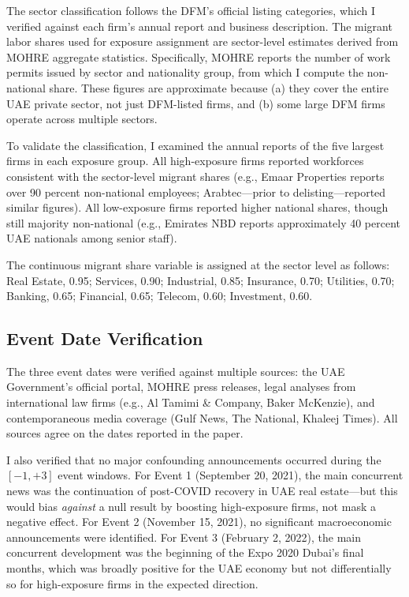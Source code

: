 \documentclass[12pt]{article}
\begin{document}
The sector classification follows the DFM's official listing categories, which I verified against each firm's annual report and business description. The migrant labor shares used for exposure assignment are sector-level estimates derived from MOHRE aggregate statistics. Specifically, MOHRE reports the number of work permits issued by sector and nationality group, from which I compute the non-national share. These figures are approximate because (a) they cover the entire UAE private sector, not just DFM-listed firms, and (b) some large DFM firms operate across multiple sectors.

To validate the classification, I examined the annual reports of the five largest firms in each exposure group. All high-exposure firms reported workforces consistent with the sector-level migrant shares (e.g., Emaar Properties reports over 90 percent non-national employees; Arabtec---prior to delisting---reported similar figures). All low-exposure firms reported higher national shares, though still majority non-national (e.g., Emirates NBD reports approximately 40 percent UAE nationals among senior staff).

The continuous migrant share variable is assigned at the sector level as follows: Real Estate, 0.95; Services, 0.90; Industrial, 0.85; Insurance, 0.70; Utilities, 0.70; Banking, 0.65; Financial, 0.65; Telecom, 0.60; Investment, 0.60.

\subsection{Event Date Verification}

The three event dates were verified against multiple sources: the UAE Government's official portal, MOHRE press releases, legal analyses from international law firms (e.g., Al Tamimi \& Company, Baker McKenzie), and contemporaneous media coverage (Gulf News, The National, Khaleej Times). All sources agree on the dates reported in the paper.

I also verified that no major confounding announcements occurred during the $[-1, +3]$ event windows. For Event 1 (September 20, 2021), the main concurrent news was the continuation of post-COVID recovery in UAE real estate---but this would bias \emph{against} a null result by boosting high-exposure firms, not mask a negative effect. For Event 2 (November 15, 2021), no significant macroeconomic announcements were identified. For Event 3 (February 2, 2022), the main concurrent development was the beginning of the Expo 2020 Dubai's final months, which was broadly positive for the UAE economy but not differentially so for high-exposure firms in the expected direction.
\end{document}
